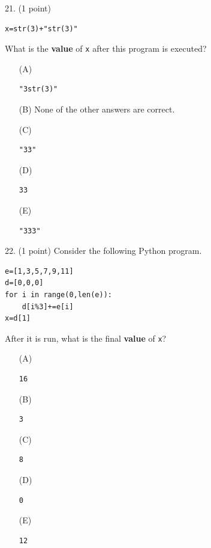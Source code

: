 \documentclass{article}
\begin{document}
\noindent
\begin{minipage}{\textwidth}
21. (1 point)
\begin{verbatim}
x=str(3)+"str(3)"
\end{verbatim}
What is the \textbf{value} of \texttt{x} after this program is executed?

\begin{enumerate}
\item[(A)]
\begin{verbatim}"3str(3)"\end{verbatim}

\item[(B)]
None of the other answers are correct.

\item[(C)]
\begin{verbatim}"33"\end{verbatim}

\item[(D)]
\begin{verbatim}33\end{verbatim}

\item[(E)]
\begin{verbatim}"333"\end{verbatim}

\end{enumerate}
\end{minipage}
\vspace{2em}
\filbreak\vfil{}\vfilneg

\noindent
\begin{minipage}{\textwidth}
22. (1 point)
Consider the following Python program.
\begin{verbatim}
e=[1,3,5,7,9,11]
d=[0,0,0]
for i in range(0,len(e)):
    d[i%3]+=e[i]
x=d[1]
\end{verbatim}
After it is run, what is the final \textbf{value} of \texttt{x}?

\begin{enumerate}
\item[(A)]
\begin{verbatim}16\end{verbatim}

\item[(B)]
\begin{verbatim}3\end{verbatim}

\item[(C)]
\begin{verbatim}8\end{verbatim}

\item[(D)]
\begin{verbatim}0\end{verbatim}

\item[(E)]
\begin{verbatim}12\end{verbatim}

\end{enumerate}
\end{minipage}
\vspace{2em}
\filbreak\vfil{}\vfilneg
\end{document}

